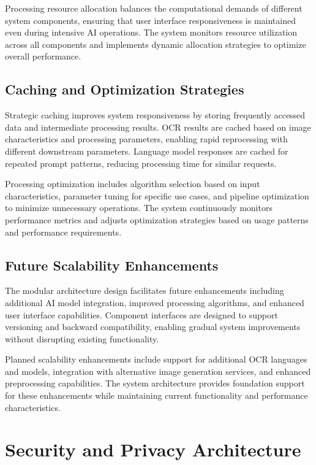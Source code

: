 Processing resource allocation balances the computational demands of different system components, ensuring that user interface responsiveness is maintained even during intensive AI operations. The system monitors resource utilization across all components and implements dynamic allocation strategies to optimize overall performance.

\subsection{Caching and Optimization Strategies}

Strategic caching improves system responsiveness by storing frequently accessed data and intermediate processing results. OCR results are cached based on image characteristics and processing parameters, enabling rapid reprocessing with different downstream parameters. Language model responses are cached for repeated prompt patterns, reducing processing time for similar requests.

Processing optimization includes algorithm selection based on input characteristics, parameter tuning for specific use cases, and pipeline optimization to minimize unnecessary operations. The system continuously monitors performance metrics and adjusts optimization strategies based on usage patterns and performance requirements.

\subsection{Future Scalability Enhancements}

The modular architecture design facilitates future enhancements including additional AI model integration, improved processing algorithms, and enhanced user interface capabilities. Component interfaces are designed to support versioning and backward compatibility, enabling gradual system improvements without disrupting existing functionality.

Planned scalability enhancements include support for additional OCR languages and models, integration with alternative image generation services, and enhanced preprocessing capabilities. The system architecture provides foundation support for these enhancements while maintaining current functionality and performance characteristics.

\section{Security and Privacy Architecture}

